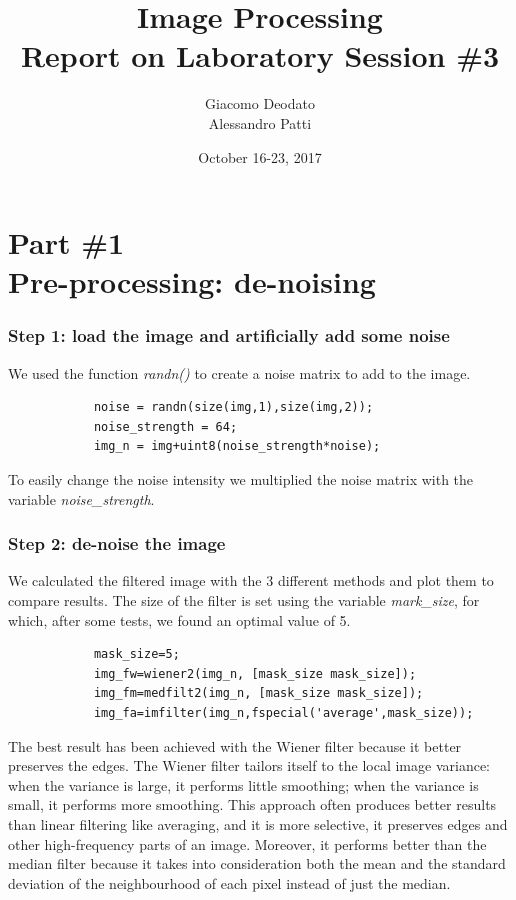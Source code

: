 \documentclass[12pt,a4paper,oneside,final,titlepage,openany,onecolumn]{article}
\author{Giacomo Deodato\\ Alessandro Patti}
\title{Image Processing\\ \textbf{Report on Laboratory Session \#3}}
\date{October 16-23, 2017}
\begin{document}
	\maketitle
	\section*{{\small Part \#1} \\ Pre-processing: de-noising}
		\subsubsection*{Step 1: load the image and artificially add some noise}
		\par
		We used the function \textit{randn()} to create a noise matrix to add to the image.
		\begin{lstlisting}
			noise = randn(size(img,1),size(img,2));
			noise_strength = 64;
			img_n = img+uint8(noise_strength*noise);
		\end{lstlisting}
		To easily change the noise intensity we multiplied the noise matrix with the variable \textit{noise\_strength}.
		\subsubsection*{Step 2: de-noise the image}
		\par
		We calculated the filtered image with the 3 different methods and plot them to compare results. The size of the filter is set using the variable \textit{mark\_size}, for which, after some tests, we found an optimal value of 5.
		\begin{lstlisting}
			mask_size=5;
			img_fw=wiener2(img_n, [mask_size mask_size]);
			img_fm=medfilt2(img_n, [mask_size mask_size]);
			img_fa=imfilter(img_n,fspecial('average',mask_size));
		\end{lstlisting}
		The best result has been achieved with the Wiener filter because it better preserves the edges.
		\newline
		The Wiener filter tailors itself to the local image variance: when the variance is large, it performs little smoothing; when the variance is small, it performs more smoothing.
		\newline
		This approach often produces better results than linear filtering like averaging, and it is more selective, it preserves edges and other high-frequency parts of an image.
		\newline
		Moreover, it performs better than the median filter because it takes into consideration both the mean and the standard deviation of the neighbourhood of each pixel instead of just the median.
	
\end{document}
